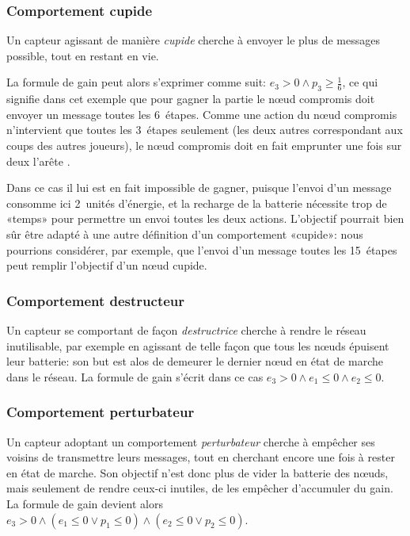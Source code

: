         \subsubsection{Comportement cupide}
Un capteur agissant de manière \emph{cupide} cherche à envoyer le plus de messages possible, tout en restant en vie.

La formule de gain peut alors s'exprimer comme suit: $e_3 > 0 \wedge p_3 \geq \frac16$, ce qui signifie dans cet exemple que pour gagner la partie le nœud compromis doit envoyer un message toutes les 6~étapes.
Comme une action du nœud compromis n'intervient que toutes les 3~étapes seulement (les deux autres correspondant aux coups des autres joueurs), le nœud compromis doit en fait emprunter une fois sur deux l'arête \startsend.

Dans ce cas il lui est en fait impossible de gagner, puisque l'envoi d'un message consomme ici 2~unités d'énergie, et la recharge de la batterie nécessite trop de «temps» pour permettre un envoi toutes les deux actions.
L'objectif pourrait bien sûr être adapté à une autre définition d'un comportement «cupide»: nous pourrions considérer, par exemple, que l'envoi d'un message toutes les 15~étapes peut remplir l'objectif d'un nœud cupide.

        \subsubsection{Comportement destructeur}
Un capteur se comportant de façon \emph{destructrice} cherche à rendre le réseau inutilisable, par exemple en agissant de telle façon que tous les nœuds épuisent leur batterie: son but est alos de demeurer le dernier nœud en état de marche dans le réseau.
La formule de gain s'écrit dans ce cas $e_3 >0 \wedge e_1 \leq 0 \wedge e_2 \leq 0$.

        \subsubsection{Comportement perturbateur}
Un capteur adoptant un comportement \emph{perturbateur} cherche à empêcher ses voisins de transmettre leurs messages, tout en cherchant encore une fois à rester en état de marche.
Son objectif n'est donc plus de vider la batterie des nœuds, mais seulement de rendre ceux-ci inutiles, de les empêcher d'accumuler du gain.
La formule de gain devient alors $e_3 >0 \wedge (e_1 \leq 0 \vee p_1\leq0) \wedge (e_2 \leq 0 \vee p_2\leq0)$.
